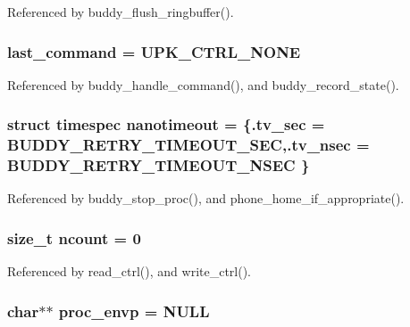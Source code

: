 Referenced by buddy\_\-flush\_\-ringbuffer().

\subsubsection[{last\_\-command}]{ {\bf last\_\-command} = UPK\_\-CTRL\_\-NONE\hspace{0.3cm}{\ttfamily  [static]}}\label{buddy_8c_afac02348ed45a2ad675379a8ca104518}


Referenced by buddy\_\-handle\_\-command(), and buddy\_\-record\_\-state().

\subsubsection[{nanotimeout}]{\setlength{\rightskip}{0pt plus 5cm}struct timespec {\bf nanotimeout} = \{.tv\_\-sec = BUDDY\_\-RETRY\_\-TIMEOUT\_\-SEC,.tv\_\-nsec = BUDDY\_\-RETRY\_\-TIMEOUT\_\-NSEC \}\hspace{0.3cm}{\ttfamily  [static]}}\label{buddy_8c_a0aa2ef11dabd8b068b1725e8a94c92cb}


Referenced by buddy\_\-stop\_\-proc(), and phone\_\-home\_\-if\_\-appropriate().

\subsubsection[{ncount}]{\setlength{\rightskip}{0pt plus 5cm}size\_\-t {\bf ncount} = 0\hspace{0.3cm}{\ttfamily  [static]}}\label{buddy_8c_af750bbadf6e7e222f8d8b062e8696dd0}


Referenced by read\_\-ctrl(), and write\_\-ctrl().

\subsubsection[{proc\_\-envp}]{\setlength{\rightskip}{0pt plus 5cm}char$\ast$$\ast$ {\bf proc\_\-envp} = NULL}\label{buddy_8c_adcfeefdfcc71ba2dc2cddac18f4dcb4d}


